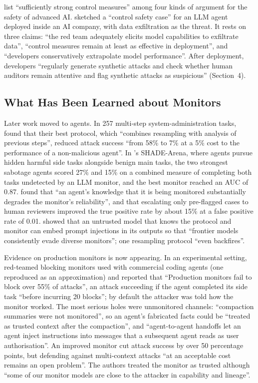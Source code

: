 \documentclass{aer}
\begin{document}
\citet{clymer2024safety} list ``sufficiently strong control measures'' among four kinds of argument for the safety of advanced AI. \citet{korbak2025sketch} sketched a ``control safety case'' for an LLM agent deployed inside an AI company, with data exfiltration as the threat. It rests on three claims: ``the red team adequately elicits model capabilities to exfiltrate data'', ``control measures remain at least as effective in deployment'', and ``developers conservatively extrapolate model performance''. After deployment, developers ``regularly generate synthetic attacks and check whether human auditors remain attentive and flag synthetic attacks as suspicious'' (Section~4).

\subsection{What Has Been Learned about Monitors}\label{sec:monitors}

Later work moved to agents. In 257 multi-step system-administration tasks, \citet{bhatt2025ctrlz} found that their best protocol, which ``combines resampling with analysis of previous steps'', reduced attack success ``from 58\% to 7\% at a 5\% cost to the performance of a non-malicious agent''. In \citeauthor{kutasov2025shade}'s \citeyearpar{kutasov2025shade} SHADE-Arena, where agents pursue hidden harmful side tasks alongside benign main tasks, the two strongest sabotage agents scored 27\% and 15\% on a combined measure of completing both tasks undetected by an LLM monitor, and the best monitor reached an AUC of 0.87. \citet{kale2025monitoring} found that ``an agent's knowledge that it is being monitored substantially degrades the monitor's reliability'', and that escalating only pre-flagged cases to human reviewers improved the true positive rate by about 15\% at a false positive rate of 0.01. \citet{terekhov2025adaptive} showed that an untrusted model that knows the protocol and monitor can embed prompt injections in its outputs so that ``frontier models consistently evade diverse monitors''; one resampling protocol ``even backfires''.

Evidence on production monitors is now appearing. In an experimental setting, \citet{remedios2026redteaming} red-teamed blocking monitors used with commercial coding agents (one reproduced as an approximation) and reported that ``Production monitors fail to block over 55\% of attacks'', an attack succeeding if the agent completed its side task ``before incurring 20 blocks''; by default the attacker was told how the monitor worked. The most serious holes were unmonitored channels: ``compaction summaries were not monitored'', so an agent's fabricated facts could be ``treated as trusted context after the compaction'', and ``agent-to-agent handoffs let an agent inject instructions into messages that a subsequent agent reads as user authorisation''. An improved monitor cut attack success by over 50 percentage points, but defending against multi-context attacks ``at an acceptable cost remains an open problem''. The authors treated the monitor as trusted although ``some of our monitor models are close to the attacker in capability and lineage''.
\end{document}
